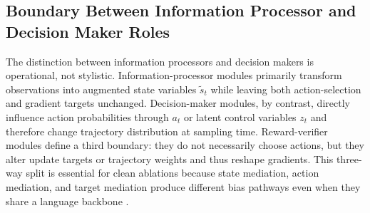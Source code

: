 \documentclass[pdflatex,sn-mathphys-num]{sn-jnl}
\begin{document}
\subsection{Boundary Between Information Processor and Decision Maker Roles}
The distinction between information processors and decision makers is operational, not stylistic. Information-processor modules primarily transform observations into augmented state variables $\tilde{s}_t$ while leaving both action-selection and gradient targets unchanged. Decision-maker modules, by contrast, directly influence action probabilities through $a_t$ or latent control variables $z_t$ and therefore change trajectory distribution at sampling time. Reward-verifier modules define a third boundary: they do not necessarily choose actions, but they alter update targets or trajectory weights and thus reshape gradients. This three-way split is essential for clean ablations because state mediation, action mediation, and target mediation produce different bias pathways even when they share a language backbone \cite{arxiv_p_2204_01691,arxiv_p_2404_03648,arxiv_p_2602_06493,arxiv_p_2602_07848}.
\end{document}
